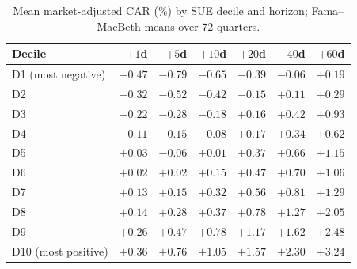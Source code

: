 \documentclass[11pt]{article}
\theoremstyle{definition}
\newcommand{\1}{\mathbf{1}}
\begin{document}
\begin{table}[t]\centering\small
\caption{Mean market-adjusted CAR (\%) by SUE decile and horizon; Fama--MacBeth means over 72 quarters.}\label{tab:deciles}
\begin{tabular}{lrrrrrr}
\toprule
Decile & $+1$d & $+5$d & $+10$d & $+20$d & $+40$d & $+60$d \\
\midrule
D1 (most negative) & $-0.47$ & $-0.79$ & $-0.65$ & $-0.39$ & $-0.06$ & $+0.19$ \\
D2 & $-0.32$ & $-0.52$ & $-0.42$ & $-0.15$ & $+0.11$ & $+0.29$ \\
D3 & $-0.22$ & $-0.28$ & $-0.18$ & $+0.16$ & $+0.42$ & $+0.93$ \\
D4 & $-0.11$ & $-0.15$ & $-0.08$ & $+0.17$ & $+0.34$ & $+0.62$ \\
D5 & $+0.03$ & $-0.06$ & $+0.01$ & $+0.37$ & $+0.66$ & $+1.15$ \\
D6 & $+0.02$ & $+0.02$ & $+0.15$ & $+0.47$ & $+0.70$ & $+1.06$ \\
D7 & $+0.13$ & $+0.15$ & $+0.32$ & $+0.56$ & $+0.81$ & $+1.29$ \\
D8 & $+0.14$ & $+0.28$ & $+0.37$ & $+0.78$ & $+1.27$ & $+2.05$ \\
D9 & $+0.26$ & $+0.47$ & $+0.78$ & $+1.17$ & $+1.62$ & $+2.48$ \\
D10 (most positive) & $+0.36$ & $+0.76$ & $+1.05$ & $+1.57$ & $+2.30$ & $+3.24$ \\
\bottomrule
\end{tabular}
\end{table}
\end{document}
